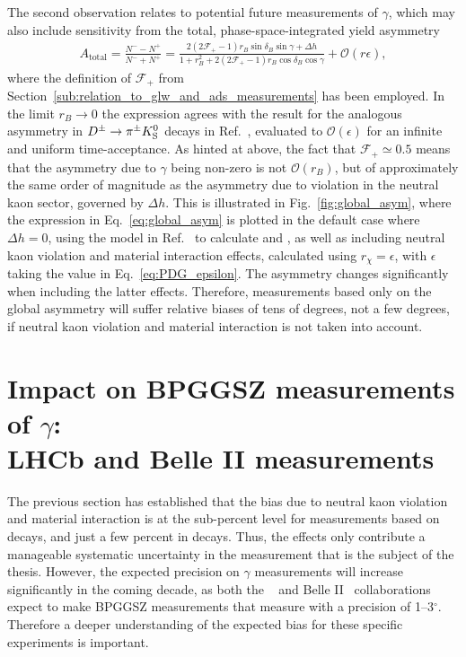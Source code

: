 The second observation relates to potential future measurements of $\gamma$, which may also include sensitivity from the total, phase-space-integrated yield asymmetry
\begin{align}\label{eq:global_asym}
    A_\text{total}=\frac{N^--N^+}{N^-+N^+} = 
    \frac{ 2(2\mathcal F_+ -1)r_B \sin \delta_B \sin \gamma +\Delta h}
    {1 + r_B^2+ 2(2\mathcal F_+ -1) r_B \cos \delta_B \cos \gamma} + \mathcal O(r\epsilon),
\end{align}
where the definition of $\mathcal F_+$ from Section~\ref{sub:relation_to_glw_and_ads_measurements} has been employed. In the limit $r_B\to 0$ the expression agrees with the result for the analogous asymmetry in ${{D}^\pm}\rightarrow{\ensuremath{{\pi}^\pm}}{\ensuremath{{K}^0_{\mathrm{S}}}}$ decays in Ref.~\cite{grossmanCPViolationKSv2012}, evaluated to $\mathcal O(\epsilon)$ for an infinite and uniform time-acceptance. As hinted at above, the fact that $\mathcal F_+\simeq 0.5$ means that the asymmetry due to $\gamma$ being non-zero is not $\mathcal O(r_B)$, but of approximately the same order of magnitude as the asymmetry due to \CP violation in the neutral kaon sector, governed by $\Delta h$. This is illustrated in Fig.~\ref{fig:global_asym}, where the expression in Eq.~\eqref{eq:global_asym} is plotted in the default case where $\Delta h=0$, using the model in Ref.~\cite{Belle2018} to calculate \Ki and \ci, as well as including neutral kaon \CP violation and material interaction effects, calculated using $r_\chi=\epsilon$, with $\epsilon$ taking the value in Eq.~\eqref{eq:PDG_epsilon}. The asymmetry changes significantly when including the latter effects. Therefore, measurements based only on the global asymmetry will suffer relative biases of tens of degrees, not a few degrees, if neutral kaon \CP violation and material interaction is not taken into account. 




\section{\texorpdfstring{Impact on BPGGSZ measurements of $\gamma$:\\LHCb and Belle II measurements}{Impact on BPGGSZ measurements of gamma: LHCb and Belle II measurements}} %
\label{sec:impact_on_ggsz_measurements}

The previous section has established that the bias due to neutral kaon \CP violation and material interaction is at the sub-percent level for measurements based on \BtoDK decays, and just a few percent in \BtoDpi decays. Thus, the effects only contribute a manageable systematic uncertainty in the measurement that is the subject of the thesis. However, the expected precision on $\gamma$ measurements will increase significantly in the coming decade, as both the \lhcb~\cite{lhcbcollaborationPhysicsCaseLHCb2019} and Belle II~\cite{kouBelleIIPhysics2019} collaborations expect to make BPGGSZ measurements that measure \g with a precision of 1--3$^\circ$. Therefore a deeper understanding of the expected bias for these specific experiments is important.

